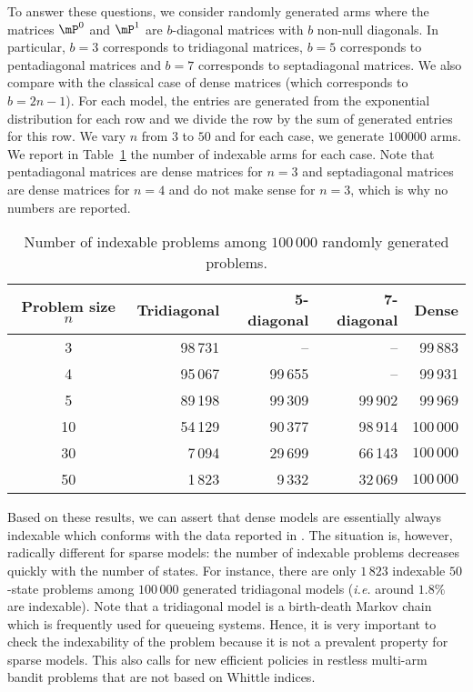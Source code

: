 To answer these questions, we consider randomly generated arms where the matrices $\mP^0$ and $\mP^1$ are $b$-diagonal matrices with $b$  non-null diagonals. In particular, $b=3$ corresponds to tridiagonal matrices, $b=5$ corresponds to pentadiagonal matrices and $b=7$ corresponds to septadiagonal matrices. We also compare with the classical case of dense matrices (which corresponds to $b=2n-1$).  For each model, the entries are generated from the exponential distribution for each row and we divide the row by the sum of generated entries for this row.   We vary $n$ from $3$ to $50$ and for each case, we generate $100000$ arms. We report in Table~\ref{tb:number_indexable} the number of indexable arms for each case. Note that pentadiagonal matrices are dense matrices for $n=3$ and septadiagonal matrices are dense matrices for $n=4$ and do not make sense for $n=3$, which is why no numbers are reported.

\begin{table}[ht]
    \caption{Number of indexable problems among $100\,000$ randomly generated problems.}
    \centering
    \label{tb:number_indexable}
    \begin{tabular}{|c|r|r|r|r|}
        \hline
        Problem size $n$ &  Tridiagonal &  5-diagonal &  7-diagonal &  Dense \\
        \hline
        3  &     98\,731 &        -- &        -- &   99\,883 \\
        4  &     95\,067 &     99\,655 &        -- &   99\,931 \\
        5  &     89\,198 &     99\,309 &     99\,902 &   99\,969 \\
        10 &     54\,129 &     90\,377 &     98\,914 &  100\,000 \\
        30 &      7\,094 &     29\,699 &     66\,143 &  $100\,000$ \\
        50 &      1\,823 &      9\,332 &     32\,069 &  $100\,000$ \\
        \hline
    \end{tabular}
\end{table}

Based on these results, we can assert that dense models are essentially always indexable which conforms with the data reported in \cite{nino2007dynamic}. The situation is, however, radically different for sparse models: the number of indexable problems decreases quickly with the number of states. For instance, there are only $1\,823$ indexable $50$-state problems among $100\,000$ generated tridiagonal models (\emph{i.e.} around $1.8\%$ are indexable). Note that a tridiagonal model is a birth-death Markov chain which is frequently used for queueing systems. Hence, it is very important to check the indexability of the problem because it is not a prevalent property for sparse models. This also calls for new efficient policies in restless multi-arm bandit problems that are not based on Whittle indices.


